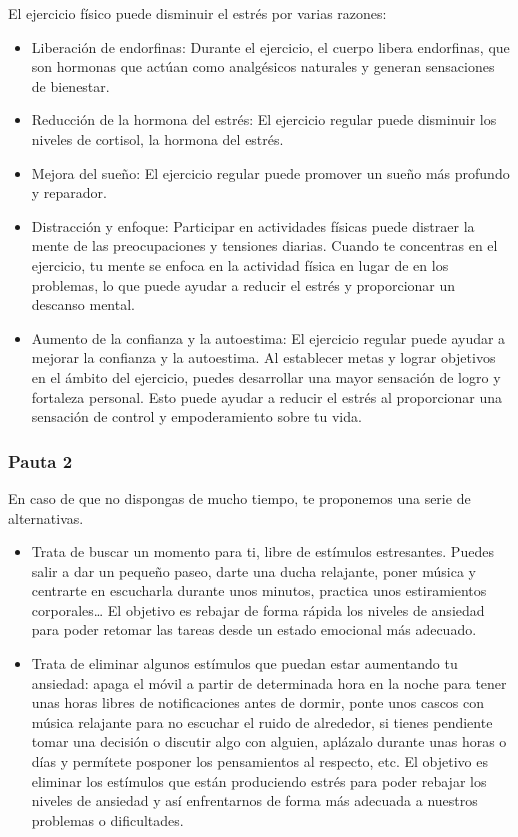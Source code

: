                 El ejercicio físico puede disminuir el estrés por varias razones:
                \begin{itemize}
                    \item Liberación de endorfinas: Durante el ejercicio, el cuerpo libera endorfinas, que son hormonas que  actúan como analgésicos naturales y generan sensaciones de bienestar. 
                    \item Reducción de la hormona del estrés: El ejercicio regular puede disminuir los niveles de cortisol, la hormona del estrés.
                    \item Mejora del sueño: El ejercicio regular puede promover un sueño más profundo y reparador.
                    \item Distracción y enfoque: Participar en actividades físicas puede distraer la mente de las preocupaciones y tensiones diarias. Cuando te concentras en el ejercicio, tu mente se enfoca en la actividad física en lugar de en los problemas, lo que puede ayudar a reducir el estrés y proporcionar un descanso mental.
                    \item Aumento de la confianza y la autoestima: El ejercicio regular puede ayudar a mejorar la confianza y la autoestima. Al establecer metas y lograr objetivos en el ámbito del ejercicio, puedes desarrollar una mayor sensación de logro y fortaleza personal. Esto puede ayudar a reducir el estrés al 
                    proporcionar una sensación de control y empoderamiento sobre tu vida.
                \end{itemize}

            \subsubsection{Pauta 2}
                En caso de que no dispongas de mucho tiempo, te proponemos una serie de alternativas. 

                \begin{itemize}
                    \item Trata de buscar un momento para ti, libre de estímulos estresantes. Puedes salir a dar un pequeño paseo, darte una ducha relajante, poner música y centrarte en escucharla durante unos minutos, practica unos estiramientos corporales… El objetivo es rebajar de forma rápida los niveles de ansiedad para poder retomar las tareas desde un estado emocional más adecuado. 
                    \item Trata de eliminar algunos estímulos que puedan estar aumentando tu ansiedad: apaga el móvil a partir de determinada hora en la noche para tener unas horas libres de notificaciones antes de dormir, ponte unos cascos con música relajante para no escuchar el ruido de alrededor, si tienes pendiente tomar una decisión o discutir algo con alguien, aplázalo durante unas horas o días y permítete posponer los pensamientos al respecto, etc. El objetivo es eliminar los estímulos que están produciendo estrés para poder rebajar los niveles de ansiedad y así enfrentarnos de forma más adecuada a nuestros problemas o dificultades. 
                \end{itemize}
